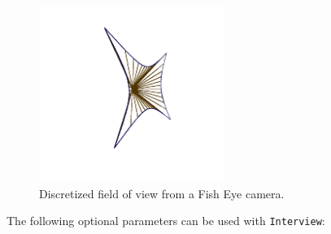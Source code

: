 \begin{figure}[!h]
	\begin{center}
		\includegraphics[width=60mm]{FIGS/Interview/apericone.png}
		\caption{Discretized field of view from a Fish Eye camera.}
	\end{center}	
\end{figure}




\noindent The following optional parameters can be used with \texttt{Interview}: \newline
 

